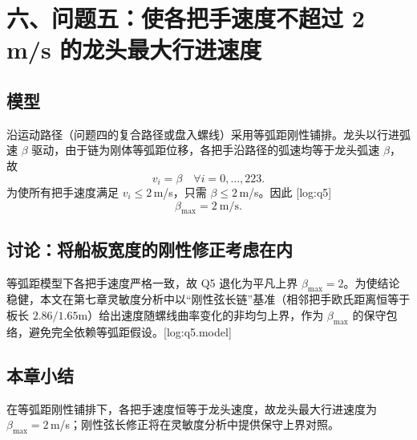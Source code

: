 \section*{六、问题五：使各把手速度不超过 2 m/s 的龙头最大行进速度}

\subsection{模型}
沿运动路径（问题四的复合路径或盘入螺线）采用等弧距刚性铺排。龙头以行进弧速 $\beta$ 驱动，由于链为刚体等弧距位移，各把手沿路径的弧速均等于龙头弧速 $\beta$，故
\begin{equation}\label{eq:q5}
v_i=\beta\quad \forall i=0,\dots,223.
\end{equation}
为使所有把手速度满足 $v_i\le2$\,m/s，只需 $\beta\le2$\,m/s。因此 [log:q5]
\begin{equation}\label{eq:beta}
\boxed{\beta_{\max}=2\ \text{m/s}.}
\end{equation}

\subsection{讨论：将船板宽度的刚性修正考虑在内}
等弧距模型下各把手速度严格一致，故 Q5 退化为平凡上界 $\beta_{\max}=2$。为使结论稳健，本文在第七章灵敏度分析中以“刚性弦长链”基准（相邻把手欧氏距离恒等于板长 $2.86/1.65$m）给出速度随螺线曲率变化的非均匀上界，作为 $\beta_{\max}$ 的保守包络，避免完全依赖等弧距假设。[log:q5.model]

\subsection{本章小结}
在等弧距刚性铺排下，各把手速度恒等于龙头速度，故龙头最大行进速度为 $\beta_{\max}=2$\,m/s；刚性弦长修正将在灵敏度分析中提供保守上界对照。